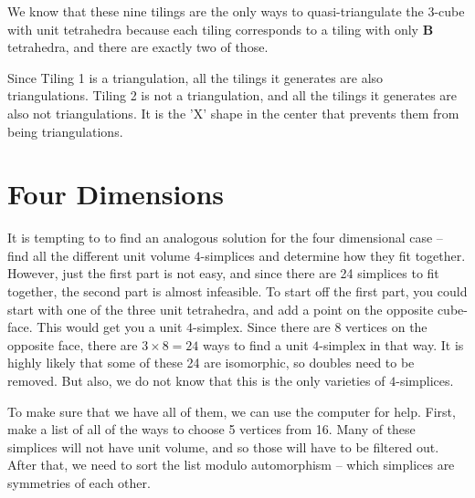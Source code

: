 \documentclass[12pt]{scrippsthesis}
\theoremstyle{definition}
\theoremstyle{remark}
\theoremstyle{plain}
\begin{document}
We know that these nine tilings are the only ways to quasi-triangulate the 3-cube with unit tetrahedra because each tiling corresponds to a tiling with only {\bf B} tetrahedra, and there are exactly two of those.

Since Tiling 1 is a triangulation, all the tilings it generates are also triangulations.  Tiling 2 is not a triangulation, and all the tilings it generates are also not triangulations.  It is the 'X' shape in the center that prevents them from being triangulations.










\section{Four Dimensions}


It is tempting to to find an analogous solution for the four dimensional case -- find all the different unit volume $4$-simplices and determine how they fit together.  However, just the first part is not easy, and since there are 24 simplices to fit together, the second part is almost infeasible.  To start off the first part, you could start with one of the three unit tetrahedra, and add a point on the opposite cube-face.  This would get you a unit $4$-simplex.  Since there are 8 vertices on the opposite face, there are $3\times8=24$ ways to find a unit $4$-simplex in that way.  It is highly likely that some of these 24 are isomorphic, so doubles need to be removed.  But also, we do not know that this is the only varieties of $4$-simplices.

To make sure that we have all of them, we can use the computer for help.  First, make a list of all of the ways to choose 5 vertices from 16.  Many of these simplices will not have unit volume, and so those will have to be filtered out.  After that, we need to sort the list modulo automorphism -- which simplices are symmetries of each other.
\end{document}
